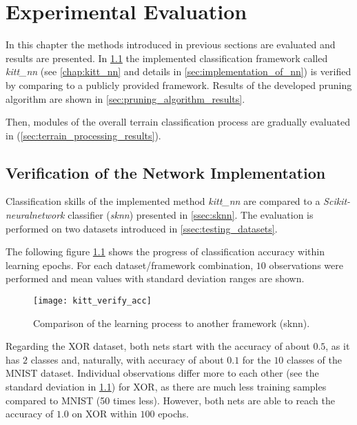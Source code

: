 \chapter{Experimental Evaluation} \label{chap:results}
In this chapter the methods introduced in previous sections are evaluated and results are presented. In \cref{sec:verification_of_nn} the implemented classification framework called \textit{kitt\_nn} (see \cref{chap:kitt_nn} and details in \cref{sec:implementation_of_nn}) is verified by comparing to a publicly provided framework. Results of the developed pruning algorithm are shown in \cref{sec:pruning_algorithm_results}.

Then, modules of the overall terrain classification process are gradually evaluated in (\cref{sec:terrain_processing_results}).

\section{Verification of the Network Implementation} \label{sec:verification_of_nn}
Classification skills of the implemented method \textit{kitt\_nn} are compared to a \textit{Scikit-neuralnetwork} classifier (\textit{sknn}) presented in \cref{ssec:sknn}. The evaluation is performed on two datasets introduced in \cref{ssec:testing_datasets}.

The following figure \ref{fig:kitt_verify_acc} shows the progress of classification accuracy within learning epochs. For each dataset/framework combination, $ 10 $ observations were performed and mean values with standard deviation ranges are shown.

\begin{figure}[H]
  \centering
  \texttt{[image: kitt\_verify\_acc]}
  \caption{Comparison of the learning process to another framework (sknn).}
  \label{fig:kitt_verify_acc}
\end{figure}

Regarding the XOR dataset, both nets start with the accuracy of about $ 0.5 $, as it has $ 2 $ classes and, naturally, with accuracy of about $ 0.1 $ for the $ 10 $ classes of the MNIST dataset. Individual observations differ more to each other (see the standard deviation in \cref{fig:kitt_verify_acc}) for XOR, as there are much less training samples compared to MNIST (50 times less). However, both nets are able to reach the accuracy of $ 1.0 $ on XOR within $ 100 $ epochs.


